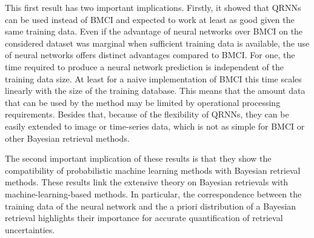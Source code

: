 This first result has two important implications. Firstly, it showed that QRNNs
can be used instead of BMCI and expected to work at least as good given the same
training data. Even if the advantage of neural networks over BMCI on the
considered dataset was marginal when sufficient training data is available, the
use of neural networks offers distinct advantages compared to BMCI. For one, the
time required to produce a neural network prediction is independent of the
training data size. At least for a naive implementation of BMCI this time scales
linearly with the size of the training database. This means that the amount data
that can be used by the method may be limited by operational processing
requirements. Besides that, because of the flexibility of QRNNs, they can be
easily extended to image or time-series data, which is not as simple for BMCI or
other Bayesian retrieval methods.

The second important implication of these results is that they show the
compatibility of probabilistic machine learning methods with Bayesian retrieval
methods. These results link the extensive theory on Bayesian retrievals
\citep{rodgers00, tarantola05} with machine-learning-based methods. In
particular, the correspondence between the training data of the neural network
and the a priori distribution of a Bayesian retrieval highlights their
importance for accurate quantification of retrieval uncertainties.


